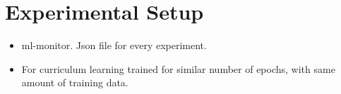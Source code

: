 \section{Experimental Setup}
\label{sec:experimentalSetup}
\begin{itemize}
\item ml-monitor. Json file for every experiment.
\item For curriculum learning trained for similar number of epochs, with same amount of training data.
\end{itemize}